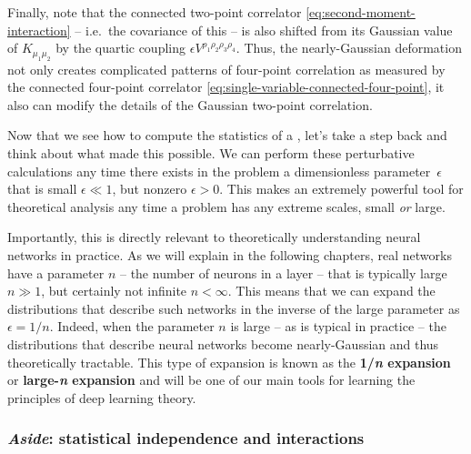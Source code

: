 Finally, note that the connected two-point correlator \eqref{eq:second-moment-interaction} -- i.e.~the covariance of this  -- is also shifted from its Gaussian value of $K_{\mu_1\mu_2}$ by the quartic coupling $\epsilon V^{\rho_1\rho_2\rho_3\rho_4}$. Thus, the nearly-Gaussian deformation not only creates complicated patterns of four-point correlation as measured by the connected four-point correlator \eqref{eq:single-variable-connected-four-point}, it also can modify the details of the Gaussian two-point correlation.










Now that we see how to compute the statistics of a , let's take a step back and think about what made this possible.
We can perform these perturbative calculations any time there exists in the problem a dimensionless parameter~$\epsilon$ that is small $\epsilon \ll 1$, but nonzero $\epsilon > 0$.
This makes  an extremely powerful tool for theoretical analysis any time a problem has any extreme scales, small \emph{or} large.


Importantly, this is directly relevant to theoretically understanding neural networks in practice. 
As we will explain in the following chapters, real networks have a parameter $n$ -- the number of neurons in a layer -- that is typically large $n \gg 1$, but certainly not infinite $n < \infty$.  This means that we can expand the distributions that describe such networks in the inverse of the large parameter as $\epsilon =1/n$.
Indeed, when the parameter $n$ is large -- as is typical in practice -- the distributions that describe neural networks become nearly-Gaussian and thus theoretically tractable.
This type of expansion is known as the \textbf{1/\emph{n} expansion} or \textbf{large-\emph{n} expansion} and will be one of our main tools for learning the principles of deep learning theory.



\subsubsection{\emph{Aside}: statistical independence and interactions}

